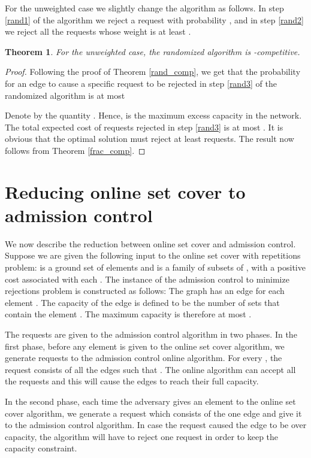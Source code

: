 \documentclass{sig-alternate}
\newtheorem{theorem}{Theorem}\newtheorem{prop}[theorem]{Proposition}
\begin{document}
For the unweighted case we slightly change the algorithm as
follows. In step \ref{rand1} of the algorithm we reject a request
with probability , and in step \ref{rand2} we
reject all the requests whose weight is at least .

\begin{theorem}\label{unweighted_rand_comp}
For the unweighted case, the randomized algorithm is -competitive.
\end{theorem}

\begin{proof}
Following the proof of Theorem \ref{rand_comp}, we get that the
probability for an edge to cause a specific request to be rejected
in step \ref{rand3} of the randomized algorithm is at most


Denote by  the quantity . Hence,
 is the maximum excess capacity in the network. The total
expected cost of requests rejected in step \ref{rand3} is at most
. It is obvious that the optimal solution must
reject at least  requests. The result now follows from Theorem
\ref{frac_comp}.

\end{proof}

\section{Reducing online set cover to admission control}\label{sec:reduction}
We now describe the reduction between online set cover and
admission control. Suppose we are given the following input to the
online set cover with repetitions problem:  is a ground set of
 elements and  is a family of  subsets of , with a
positive cost  associated with each . The instance
of the admission control to minimize rejections problem is
constructed as follows: The graph  has an edge  for
each element . The capacity of the edge  is defined
to be the number of sets that contain the element . The maximum
capacity is therefore at most .

The requests are given to the admission control algorithm in two
phases. In the first phase, before any element is given to the
online set cover algorithm, we generate  requests to the
admission control online algorithm. For every , the
request consists of all the edges  such that . The
online algorithm can accept all the requests and this will cause
the edges to reach their full capacity.

In the second phase, each time the adversary gives an element 
to the online set cover algorithm, we generate a request which
consists of the one edge  and give it to the admission
control algorithm. In case the request caused the edge  to be
over capacity, the algorithm will have to reject one request in
order to keep the capacity constraint.
\end{document}
